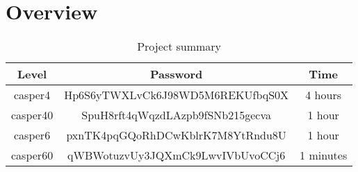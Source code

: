 \section{Overview}
\begin{table}[h]
	\centering
	\begin{tabular}{|c|c|c|}
		\hline
		\textbf{Level} & \textbf{Password} 								& \textbf{Time} \\ \hline
		casper4        & Hp6S6yTWXLvCk6J98WD5M6REKUfbqS0X               & 4 hours       \\ \hline
		casper40       & SpuH8rft4qWqzdLAzpb9fSNb215gecva				& 1 hour        \\ \hline
		casper6        & pxnTK4pqGQoRhDCwKblrK7M8YtRndu8U				& 1 hour        \\ \hline
		casper60       & qWBWotuzvUy3JQXmCk9LwvIVbUvoCCj6				& 1 minutes    \\ \hline
	\end{tabular}
	\caption{Project summary}
	\label{tbl:summary}
\end{table}
